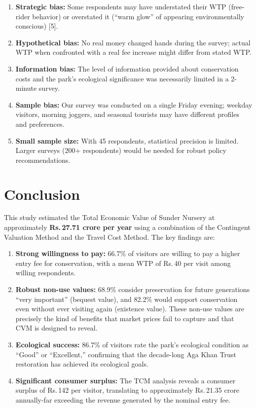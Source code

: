 \documentclass[12pt, a4paper]{article}
\newcommand{\rupee}{\textrm{Rs.}\,}
\begin{document}
\begin{enumerate}
    \item \textbf{Strategic bias:} Some respondents may have understated their WTP (free-rider behavior) or overstated it (``warm glow'' of appearing environmentally conscious) [5].
    \item \textbf{Hypothetical bias:} No real money changed hands during the survey; actual WTP when confronted with a real fee increase might differ from stated WTP.
    \item \textbf{Information bias:} The level of information provided about conservation costs and the park's ecological significance was necessarily limited in a 2-minute survey.
    \item \textbf{Sample bias:} Our survey was conducted on a single Friday evening; weekday visitors, morning joggers, and seasonal tourists may have different profiles and preferences.
    \item \textbf{Small sample size:} With 45 respondents, statistical precision is limited. Larger surveys (200+ respondents) would be needed for robust policy recommendations.
\end{enumerate}

\section{Conclusion}

This study estimated the Total Economic Value of Sunder Nursery at approximately \textbf{\rupee 27.71 crore per year} using a combination of the Contingent Valuation Method and the Travel Cost Method. The key findings are:

\begin{enumerate}
    \item \textbf{Strong willingness to pay:} 66.7\% of visitors are willing to pay a higher entry fee for conservation, with a mean WTP of \rupee 40 per visit among willing respondents.

    \item \textbf{Robust non-use values:} 68.9\% consider preservation for future generations ``very important'' (bequest value), and 82.2\% would support conservation even without ever visiting again (existence value). These non-use values are precisely the kind of benefits that market prices fail to capture and that CVM is designed to reveal.

    \item \textbf{Ecological success:} 86.7\% of visitors rate the park's ecological condition as ``Good'' or ``Excellent,'' confirming that the decade-long Aga Khan Trust restoration has achieved its ecological goals.

    \item \textbf{Significant consumer surplus:} The TCM analysis reveals a consumer surplus of \rupee 142 per visitor, translating to approximately \rupee 21.35 crore annually-far exceeding the revenue generated by the nominal entry fee.
\end{enumerate}
\end{document}
